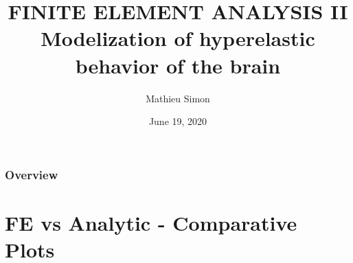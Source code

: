 \documentclass{beamer}
\title[FEA II - The FEniCS Project]{
\LARGE
\uppercase{FINITE ELEMENT ANALYSIS II} \\ 
\normalsize Modelization of hyperelastic behavior of the brain
}
\author{Mathieu Simon}
\institute[University of Bern]
{
MSc - Biomedical Engineering \\
University of Bern, Faculty of Medicine \\
\medskip
}
\date{June 19, 2020}
\begin{document}
\begin{frame}
\titlepage
\end{frame}

\begin{frame}
\frametitle{Overview}
\tableofcontents 
\end{frame}



\section{FE vs Analytic - Comparative Plots}
\end{document}
